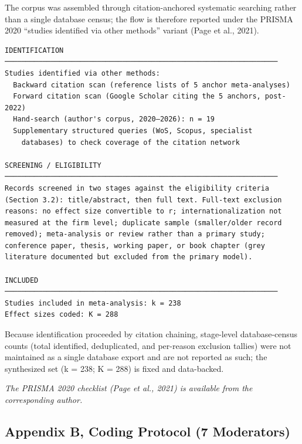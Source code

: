 \documentclass[
  12pt,a4paper]{article}
\begin{document}
The corpus was assembled through citation-anchored systematic searching
rather than a single database census; the flow is therefore reported
under the PRISMA 2020 ``studies identified via other methods'' variant
(Page et al., 2021).

\begin{verbatim}
IDENTIFICATION
─────────────────────────────────────────────────────────────────
Studies identified via other methods:
  Backward citation scan (reference lists of 5 anchor meta-analyses)
  Forward citation scan (Google Scholar citing the 5 anchors, post-2022)
  Hand-search (author's corpus, 2020–2026): n = 19
  Supplementary structured queries (WoS, Scopus, specialist
    databases) to check coverage of the citation network

SCREENING / ELIGIBILITY
─────────────────────────────────────────────────────────────────
Records screened in two stages against the eligibility criteria
(Section 3.2): title/abstract, then full text. Full-text exclusion
reasons: no effect size convertible to r; internationalization not
measured at the firm level; duplicate sample (smaller/older record
removed); meta-analysis or review rather than a primary study;
conference paper, thesis, working paper, or book chapter (grey
literature documented but excluded from the primary model).

INCLUDED
─────────────────────────────────────────────────────────────────
Studies included in meta-analysis: k = 238
Effect sizes coded: K = 288
\end{verbatim}

Because identification proceeded by citation chaining, stage-level
database-census counts (total identified, deduplicated, and per-reason
exclusion tallies) were not maintained as a single database export and
are not reported as such; the synthesized set (k = 238; K = 288) is
fixed and data-backed.

\emph{The PRISMA 2020 checklist (Page et al., 2021) is available from
the corresponding author.}

\hypertarget{appendix-b-coding-protocol-7-moderators}{%
\subsection{Appendix B, Coding Protocol (7
Moderators)}\label{appendix-b-coding-protocol-7-moderators}}
\end{document}
